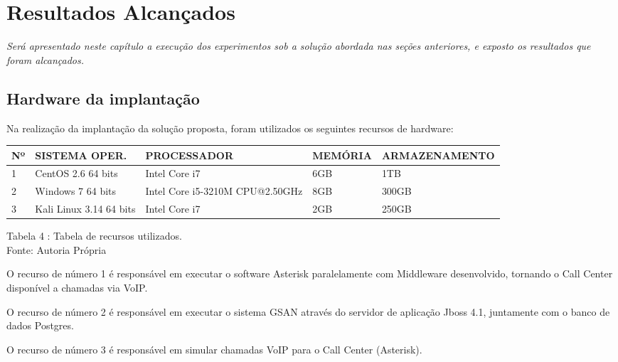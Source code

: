 \chapter[Resultados Alcançados]{\textbf{R}esultados \textbf{A}lcançados}

\textit{Será apresentado neste capítulo a execução dos experimentos sob a solução abordada nas seções anteriores, e exposto os resultados que foram alcançados.}

\section{Hardware da implantação}

Na realização da implantação da solução proposta,  foram utilizados os seguintes recursos de hardware:

\begin{table}[htb]
	\center
	\footnotesize
	\begin{tabular}{|p{0.5cm}|p{3.5cm}|p{3cm}|p{2cm}|p{4cm}|} \hline
		\textbf{Nº} & \textbf{SISTEMA OPER.} & \textbf{PROCESSADOR} & \textbf{MEMÓRIA} & \textbf{ARMAZENAMENTO}  \\ \hline
		1 & CentOS 2.6 64 bits & Intel Core i7 & 6GB & 1TB \\ \hline
		2 & Windows 7 64 bits & Intel Core i5-3210M CPU@2.50GHz & 8GB & 300GB \\ \hline
		3 & Kali Linux 3.14 64 bits & Intel Core i7 & 2GB & 250GB \\ \hline
	\end{tabular}
\end{table}
\begin{center}
	Tabela  4 : Tabela de recursos utilizados. \\
	Fonte: Autoria Própria
\end{center}

\begin{description}
	\item O recurso de número 1 é responsável em executar o software Asterisk paralelamente com Middleware desenvolvido, tornando o Call Center disponível a chamadas via VoIP.
	\item O recurso de número 2 é responsável em executar o sistema GSAN através do servidor de aplicação Jboss 4.1,  juntamente com o banco de dados Postgres.
	\item O recurso de número 3 é responsável em simular chamadas VoIP para o Call Center (Asterisk).	
\end{description}


